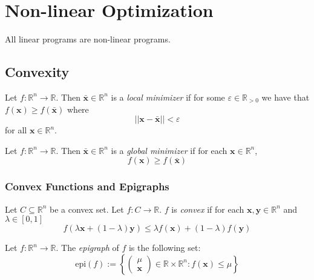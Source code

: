 \chapter{Non-linear Optimization}

All linear programs are non-linear programs.
\section{Convexity}
\begin{defbox}
    \begin{definition}
        Let $ f:\mathbb{R}^n\to \mathbb{R} $. Then $ \bm{\bar{x}}\in\mathbb{R}^n $
        is a \emph{local minimizer} if for some $ \varepsilon\in\mathbb{R}_{>0} $
        we have that $ f(\bm{x})\geqslant f(\bm{\bar{x}}) $ where
        \[ ||\bm{x}-\bm{\bar{x}}||<\varepsilon \]
        for all $ \bm{x}\in\mathbb{R}^n $.
    \end{definition}
\end{defbox}

\begin{defbox}
    \begin{definition}
        Let $ f:\mathbb{R}^n\to \mathbb{R} $. Then $ \bm{\bar{x}}\in\mathbb{R}^n $
        is a \emph{global minimizer} if for each $ \bm{x}\in\mathbb{R}^n $,
        \[ f(\bm{x})\geqslant f(\bm{\bar{x}}) \]
    \end{definition}
\end{defbox}

\subsection{Convex Functions and Epigraphs}

\begin{defbox}
    \begin{definition}
        Let $ C\subseteq \mathbb{R}^n $ be a convex set. Let $ f:C\to\mathbb{R} $.
        $ f $ is \emph{convex} if for each $ \bm{x},\bm{y}\in\mathbb{R}^n $ and $ \lambda\in[0,1] $
        \[ f(\lambda \bm{x} + (1-\lambda)\bm{y})\leqslant \lambda f(\bm{x})+(1-\lambda)f(\bm{y}) \]
    \end{definition}
\end{defbox}

\begin{defbox}
    \begin{definition}
        Let $ f:\mathbb{R}^n\to\mathbb{R} $. The \emph{epigraph} of $ f $ is the following set:
        \[ \text{epi}(f):=\left\{
            \begin{pmatrix}
                \mu \\
                \bm{x}
            \end{pmatrix}\in\mathbb{R}\times\mathbb{R}^n:f(\bm{x})\leqslant \mu\right\} \]
    \end{definition}
\end{defbox}


